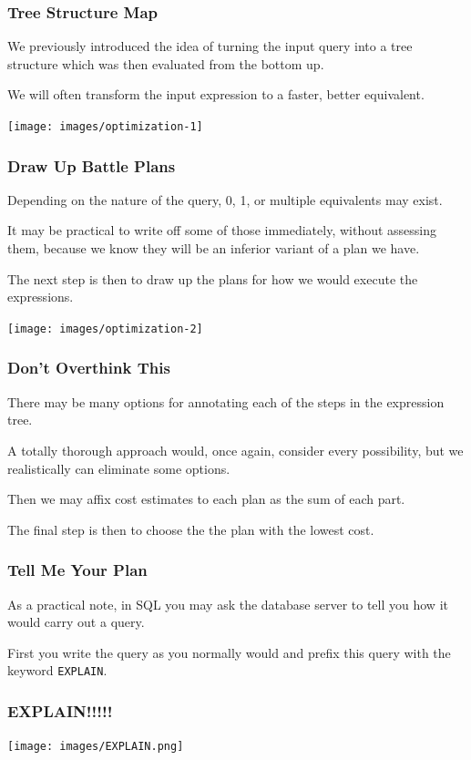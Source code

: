\begin{frame}
\frametitle{Tree Structure Map}
We previously introduced the idea of turning the input query into a tree structure which was then evaluated from the bottom up. 

We will often transform the input expression to a faster, better equivalent. 

\begin{center}
\texttt{[image: images/optimization-1]}
\end{center}


\end{frame}

\begin{frame}
\frametitle{Draw Up Battle Plans}

Depending on the nature of the query, 0, 1, or multiple equivalents may exist. 

It may be practical to write off some of those immediately, without assessing them, because we know they will be an inferior variant of a plan we have. 

The next step is then to draw up the plans for how we would execute the expressions. 

\begin{center}
\texttt{[image: images/optimization-2]}
\end{center}

\end{frame}


\begin{frame}
\frametitle{Don't Overthink This}

There may be many options for annotating each of the steps in the expression tree. 

A totally thorough approach would, once again, consider every possibility, but we realistically can eliminate some options. 

Then we may affix cost estimates to each plan as the sum of each part.

The final step is then to choose the the plan with the lowest cost.

\end{frame}

\begin{frame}
\frametitle{Tell Me Your Plan}

As a practical note, in SQL you may ask the database server to tell you how it would carry out a query. 

First you write the query as you normally would and prefix this query with the keyword \texttt{EXPLAIN}.


\end{frame}
\begin{frame}
\frametitle{EXPLAIN!!!!!}

\begin{center}
\texttt{[image: images/EXPLAIN.png]}
\end{center}


\end{frame}

